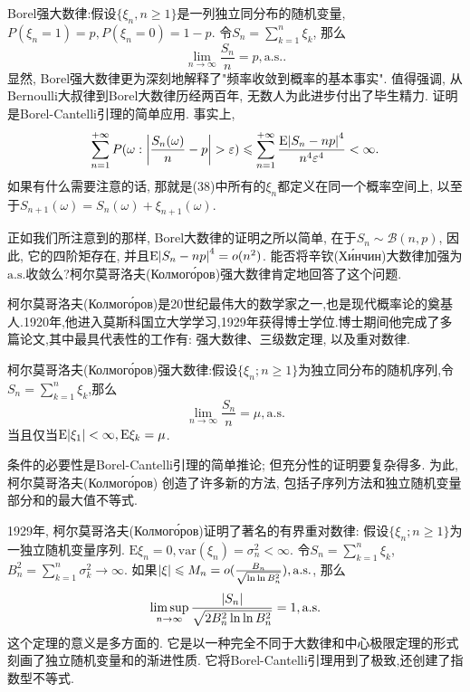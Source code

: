 \documentclass[a4paper,AutoFakeBold,oneside,12pt]{article}
\begin{document}
Borel强大数律:假设$\{\xi_n,n\geqslant 1\}$是一列独立同分布的随机变量, $P(\xi_n = 1) = p,P(\xi_n = 0) =1-p$. 令$S_n = \sum_{k=1}^n\xi_k$, 那么\begin{equation}
    \lim_{n\to\infty}\frac{S_n}{n} = p,\mathrm{a.s.}.
\end{equation}
显然, Borel强大数律更为深刻地解释了"频率收敛到概率的基本事实". 值得强调, 从Bernoulli大叔律到Borel大数律历经两百年, 无数人为此进步付出了毕生精力. 证明是Borel-Cantelli引理的简单应用. 事实上,
\begin{equation}
    \sum_{n = 1}^{+\infty}P(\omega:\abs{\frac{S_n(\omega)}{n}-p}>\varepsilon)\leqslant \sum_{n = 1}^{+\infty}\frac{\mathrm{E}\abs{S_n-np}^4}{n^4\varepsilon^4}<\infty.
\end{equation}
如果有什么需要注意的话, 那就是(38)中所有的$\xi_n$都定义在同一个概率空间上, 以至于$S_{n+1}(\omega) = S_{n}(\omega)+\xi_{n+1}(\omega)$.

正如我们所注意到的那样, Borel大数律的证明之所以简单, 在于$S_n\sim\mathcal{B}(n,p)$, 因此, 它的四阶矩存在, 并且$\mathrm{E}\abs{S_n-np}^4 = o(n^2)$. 能否将辛钦(Хи́нчин)大数律加强为$\mathrm{a.s.}$收敛么?柯尔莫哥洛夫(Колмого́ров)强大数律肯定地回答了这个问题.

柯尔莫哥洛夫(Колмого́ров)是20世纪最伟大的数学家之一,也是现代概率论的奠基人.1920年,他进入莫斯科国立大学学习,1929年获得博士学位.博士期间他完成了多篇论文,其中最具代表性的工作有: 强大数律、三级数定理, 以及重对数律.

柯尔莫哥洛夫(Колмого́ров)强大数律:假设$\{\xi_n;n\geqslant 1\}$为独立同分布的随机序列,令$S_n =\sum_{k=1}^n\xi_k$,那么\begin{equation}
    \lim_{n\to\infty}\frac{S_n}{n} = \mu,\mathrm{a.s.}
\end{equation}
当且仅当$\mathrm{E}\abs{\xi_1}<\infty,\mathrm{E}\xi_k = \mu$.

条件的必要性是Borel-Cantelli引理的简单推论; 但充分性的证明要复杂得多. 为此, 柯尔莫哥洛夫(Колмого́ров)
创造了许多新的方法, 包括子序列方法和独立随机变量部分和的最大值不等式.

1929年, 柯尔莫哥洛夫(Колмого́ров)证明了著名的有界重对数律:
假设$\{\xi_n;n\geqslant 1\}$为一独立随机变量序列. $\mathrm{E}\xi_n = 0,\mathrm{var}(\xi_n) = \sigma^2_n<\infty$. 令$S_n = \sum_{k=1}^n\xi_k$, $B_n^2 = \sum_{k=1}^n\sigma_k^2\to\infty$. 如果$\abs{\xi}\leqslant M_n = o(\frac{B_n}{\sqrt{\ln\ln B_n^2}}),\mathrm{a.s.}$, 那么\begin{equation}
    \limsup_{n\to\infty}\frac{\abs{S_n}}{\sqrt{2B_n^2\ln\ln B_n^2}} = 1,\mathrm{a.s.}
\end{equation}
这个定理的意义是多方面的. 它是以一种完全不同于大数律和中心极限定理的形式刻画了独立随机变量和的渐进性质. 它将Borel-Cantelli引理用到了极致,还创建了指数型不等式.
\end{document}
